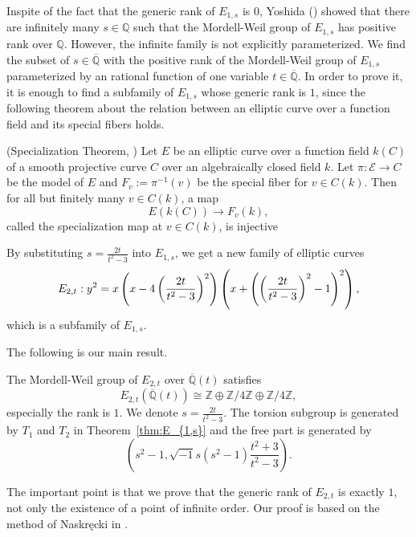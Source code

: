 \documentclass[main]{subfiles}
\begin{document}
Inspite of the fact that the generic rank of $E_{1,s}$ is $0$, Yoshida (\cite[Corollary 4.7.]{ref:yoshida}) showed that there are infinitely many $s \in \mathbb{Q}$ such that the Mordell-Weil group of $E_{1,s}$ has positive rank over $\mathbb{Q}$.
However, the infinite family is not explicitly parameterized.
We find the subset of $s \in \overline{{\mathbb{Q}}}$ with the positive rank of the Mordell-Weil group of $E_{1,s}$ parameterized by an rational function of one variable $t \in \overline{\mathbb{Q}}$.
In order to prove it, it is enough to find a subfamily of $E_{1,s}$ whose generic rank is $1$, since the following theorem about the relation between an elliptic curve over a function field and its special fibers holds.
\begin{thm}{(Specialization Theorem, \cite[Theorem 11.4.]{ref:advancedaec})}
    Let $E$ be an elliptic curve over a function field $k(C)$ of a smooth projective curve $C$ over an algebraically closed field $k$.
    Let $\pi: \mathcal{E} \to C$ be the \Neron{} model of $E$ and $F_v:=\pi^{-1}(v)$ be the special fiber for $v \in C(k)$.
    Then for all but finitely many $v \in C(k)$, a map
    \begin{equation}
        E(k(C)) \to F_{v}(k),
    \end{equation}
    called the specialization map at $v \in C(k)$, is injective
\end{thm}

By substituting $s = \frac{2t}{t^{2} - 3}$ into $E_{1,s}$, we get a new family of elliptic curves
\begin{equation}
    \label{eq:E_{2,t}}
        E_{2,t}: y^{2} = x\left(x - 4\left(\frac{2t}{t^{2} - 3}\right)^{2}\right)\left(x + \left(\left(\frac{2t}{t^{2} - 3}\right)^{2} - 1\right)^{2}\right),
    \end{equation}
which is a subfamily of $E_{1,s}$.

The following is our main result.
\begin{thm}
    \label{thm:E_{2,t}}
    The Mordell-Weil group of $E_{2,t}$ over $\overline{\mathbb{Q}}(t)$ satisfies
    \begin{equation}
        E_{2,t}(\overline{\mathbb{Q}}(t)) \cong \mathbb{Z} \oplus \mathbb{Z} / 4 \mathbb{Z} \oplus \mathbb{Z} / 4 \mathbb{Z},
    \end{equation}
    especially the rank is $1$.
    We denote $s = \frac{2t}{t^{2} - 3}$. The torsion subgroup is generated by $T_1$ and $T_2$ in Theorem~\ref{thm:E_{1,s}} and the free part is generated by
    \begin{equation}
        \left(s^{2} - 1, \sqrt{-1} s(s^{2} - 1) \frac{t^{2} + 3}{t^{2} - 3} \right).
    \end{equation}
\end{thm}
The important point is that we prove that the generic rank of $E_{2,t}$ is exactly $1$, not only the existence of a point of infinite order.
Our proof is based on the method of Naskręcki in \cite{ref:naskrecki2013}.
\end{document}
